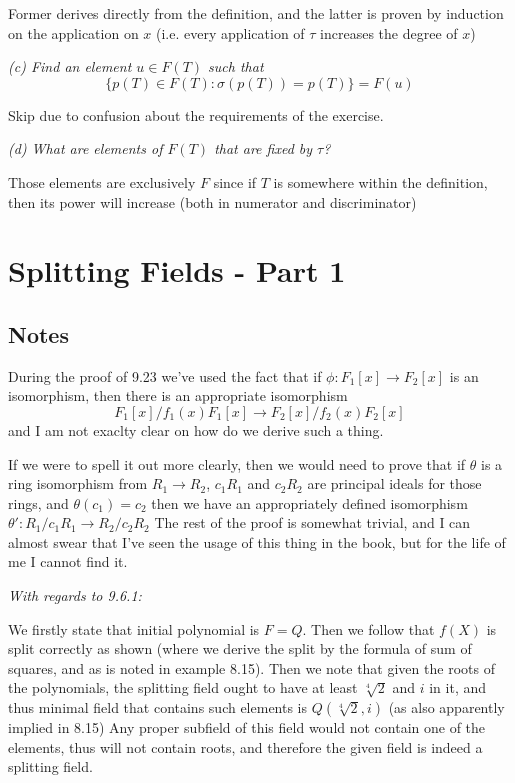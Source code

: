 \documentclass[11pt,oneside,titlepage]{book}
\newcommand{\set}[1]{\{ #1 \}}
\begin{document}
Former derives directly from the definition, and the latter is
proven by induction on the application on $x$ (i.e.
every application of $\tau$ increases the degree of $x$)

\textit{(c) Find an element $u \in F(T)$ such that
  $$\set{p(T) \in F(T): \sigma(p(T)) = p(T)} = F(u)$$
}

Skip due to confusion about the requirements of the exercise.

\textit{(d) What are elements of $F(T)$ that are fixed by $\tau$?}

Those elements are exclusively $F$ since if $T$ is somewhere within the
definition, then its power will increase (both in numerator and discriminator)

\section{Splitting Fields - Part 1}

\subsection*{Notes}

During the proof of 9.23 we've used the fact that if $\phi: F_1[x] \to
F_2[x]$ is an isomorphism, then there is an appropriate isomorphism
$$F_1[x]/f_1(x)F_1[x] \to F_2[x]/f_2(x)F_2[x]$$
and I am not exaclty clear on how do we derive such a thing.

If we were to spell it out more clearly, then we would need to prove
that if $\theta$ is a ring isomorphism from $R_1 \to R_2$, $c_1 R_1$ and
$c_2 R_2$ are principal ideals for those rings, and $\theta(c_1) = c_2$
then we have an appropriately defined isomorphism
$\theta': R_1/c_1R_1 \to R_2/c_2 R_2$ The rest of the proof is
somewhat trivial, and I can almost swear that I've seen the usage of
this thing in the book, but for the life of me I cannot find it.

\textit{With regards to 9.6.1:}

We firstly state that initial polynomial is $F = Q$. Then we follow
that $f(X)$ is split correctly as shown (where we derive the split by
the formula of sum of squares, and as is noted in example 8.15). Then
we note that given the roots of the polynomials, the splitting field
ought to have at least $\sqrt[4]{2}$ and $i$ in it, and thus minimal
field that contains such elements is $Q(\sqrt[4]{2}, i)$ (as also
apparently implied in 8.15) Any proper subfield of this field would not
contain one of the elements, thus will not contain roots, and therefore
the given field is indeed a splitting field.
\end{document}
